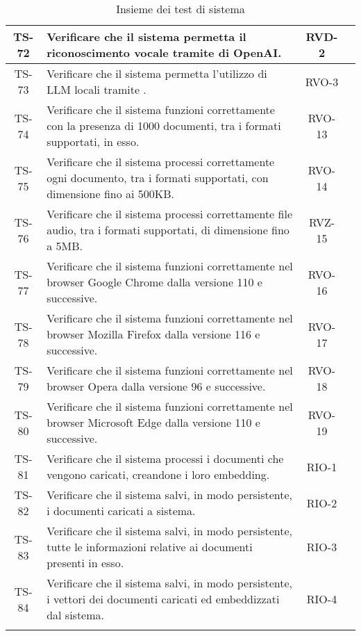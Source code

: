 \begin{xltabular}{\textwidth}{| c | X | c | c |}
    \hline
    TS-72 & Verificare che il sistema permetta il riconoscimento vocale tramite  di OpenAI. & RVD-2 & \textcolor{xmarkcolor}{}\\
    \hline
    TS-73 & Verificare che il sistema permetta l'utilizzo di LLM locali tramite . & RVO-3 & \textcolor{xmarkcolor}{} \\
    \hline
    TS-74 & Verificare che il sistema funzioni correttamente con la presenza di 1000 documenti, tra i formati supportati, in esso. & RVO-13 & \textcolor{xmarkcolor}{} \\
    \hline
    TS-75 & Verificare che il sistema processi correttamente ogni documento, tra i formati supportati, con dimensione fino ai 500KB. & RVO-14 & \textcolor{xmarkcolor}{} \\
    \hline
    TS-76 & Verificare che il sistema processi correttamente file audio, tra i formati supportati, di dimensione fino a 5MB. & RVZ-15 & \textcolor{xmarkcolor}{} \\
    \hline
    TS-77 & Verificare che il sistema funzioni correttamente nel browser Google Chrome dalla versione 110 e successive. & RVO-16 & \textcolor{xmarkcolor}{} \\
    \hline
    TS-78 & Verificare che il sistema funzioni correttamente nel browser Mozilla Firefox dalla versione 116 e successive. & RVO-17 & \textcolor{xmarkcolor}{} \\
    \hline
    TS-79 & Verificare che il sistema funzioni correttamente nel browser Opera dalla versione 96 e successive. & RVO-18 & \textcolor{xmarkcolor}{} \\
    \hline
    TS-80 & Verificare che il sistema funzioni correttamente nel browser Microsoft Edge dalla versione 110 e successive. & RVO-19 & \textcolor{xmarkcolor}{} \\
    \hline
    TS-81 & Verificare che il sistema processi i documenti che vengono caricati, creandone i loro embedding. & RIO-1 & \textcolor{xmarkcolor}{} \\
    \hline
    TS-82 & Verificare che il sistema salvi, in modo persistente, i documenti caricati a sistema. & RIO-2 & \textcolor{xmarkcolor}{} \\
    \hline
    TS-83 & Verificare che il sistema salvi, in modo persistente, tutte le informazioni relative ai documenti presenti in esso. & RIO-3 & \textcolor{xmarkcolor}{} \\
    \hline
    TS-84 & Verificare che il sistema salvi, in modo persistente, i vettori dei documenti caricati ed embeddizzati dal sistema. & RIO-4 & \textcolor{xmarkcolor}{} \\
    \hline
     \caption{Insieme dei test di sistema}
    \label{tab:test}
\end{xltabular}
\endgroup

